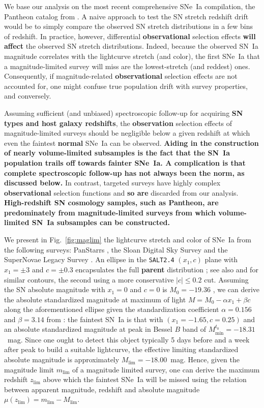 \documentclass[]{aa}
\begin{document}
We base our analysis on the most recent comprehensive SNe~Ia compilation, the
Pantheon catalog from \cite{scolnic2018a}. A naive approach to test the SN
stretch redshift drift would be to simply compare the observed SN stretch
distributions in a few bins of redshift. In practice, however, differential
\textbf{observational} selection effects \textbf{will affect} the observed SN
stretch distributions. Indeed, because the observed SN~Ia magnitude correlates
with the lightcurve stretch (and color), the first SNe~Ia that a
magnitude-limited survey will miss are the lowest-stretch (and reddest) ones.
Consequently, if magnitude-related \textbf{observational} selection effects are
not accounted for, one might confuse true population drift with survey
properties, and conversely.

Assuming sufficient (and unbiased) spectroscopic follow-up for acquiring
\textbf{SN types and host galaxy redshifts}, the \textbf{observation} selection
effects of magnitude-limited surveys should be negligible below a given redshift
at which even the faintest \textbf{normal} SNe~Ia can be observed.
\textbf{Aiding in the construction of nearly volume-limited subsamples is the
    fact that the SN~Ia population trails off towards fainter SNe~Ia. A
    complication is that complete spectroscopic follow-up has not always been
    the norm, as discussed below.} In contrast, targeted surveys have highly
    complex \textbf{observational} selection functions and \textbf{so are}
    discarded from our analysis. \textbf{High-redshift SN cosmology samples,
    such as Pantheon, are predominately from magnitude-limited surveys from
which volume-limited SN~Ia subsamples can be constructed.}

We present in Fig.~\ref{fig:maglim} the lightcurve stretch and color of SNe~Ia
from the following surveys: PanStarrs \citep[PS1][]{rest2014}, the Sloan Digital
Sky Survey \citep[SDSS][]{frieman2008} and the SuperNovae Legacy Survey
\citep[SNLS][]{astier2006}. An ellipse in the \textsc{\texttt{SALT2.4}} $(x_1,
c)$ plane with $x_1 = \pm 3$ and $c = \pm 0.3$ encapsulates the full
\textbf{parent} distribution \citep{guy2007, betoule2014}; see also
\citet{bazin2011} and \citet{campbell2013} for similar contours, the second
using a more conservative $|c| \leq 0.2$ cut. Assuming the SN absolute magnitude
with $x_1=0$ and $c=0$ is $M_0=-19.36$ \citep{kessler2009,scolnic2014}, we can
derive the absolute standardized magnitude at maximum of light $M = M_0 - \alpha
x_1 + \beta c$ along the aforementioned ellipse given the standardization
coefficient $\alpha=0.156$ and $\beta=3.14$ from \cite{scolnic2018a}: the
faintest SN~Ia is that with $(x_1=-1.65, c=0.25)$ and an absolute standardized
magnitude at peak in Bessel $B$ band of $M^{t_0}_{\min} = -18.31$~mag. Since one
ought to detect this object typically 5 days before and a week after peak to
build a suitable lightcurve, the effective limiting standardized absolute
magnitude is approximately $M_{\lim} = -18.00$~mag. Hence, given the magnitude
limit $m_{\lim}$ of a magnitude limited survey, one can derive the maximum
redshift $z_{\lim}$ above which the faintest SNe~Ia will be missed using the
relation between apparent magnitude, redshift and absolute magnitude
$\mu(z_{\lim}) = m_{\lim} - M_{\lim}$.
\end{document}
